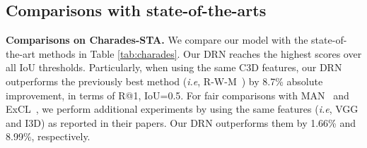 \documentclass[10pt,twocolumn,letterpaper]{article}
\def\ie{\emph{i.e}\onedot} \def\Ie{\emph{I.e}\onedot}
\begin{document}
\begin{table}[!t]
	\centering
	\caption{Comparisons on TACoS using C3D features.}
	\label{tab:tacos}
 	\vspace{-0.1in}
\end{table}
	
	
	\subsection{Comparisons with state-of-the-arts}
	
	\noindent \textbf{Comparisons on Charades-STA.}
	We compare our model with the state-of-the-art methods in Table \ref{tab:charades}. Our DRN reaches the highest scores over all IoU thresholds. Particularly, when using the same C3D features, our DRN outperforms the previously best method (\ie, R-W-M~\cite{he2019read}) by 8.7\% absolute improvement, in terms of R@1, IoU=0.5. For fair comparisons with MAN~\cite{zhang2019man} and ExCL~\cite{ghosh2019excl}, we perform additional experiments by using the same features (\ie,  VGG and I3D) as reported in their papers. Our DRN outperforms them by 1.66\% and 8.99\%, respectively. 
	
\end{document}
